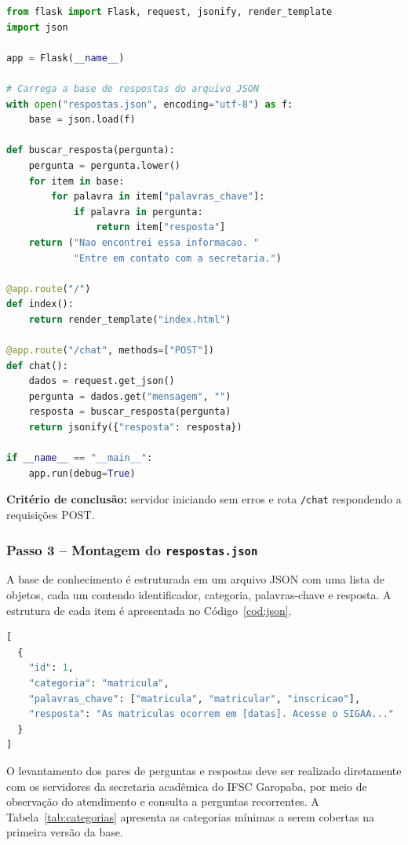 \begin{lstlisting}[language=Python, caption={Estrutura básica do app.py -- Protótipo 1}, label={cod:apppy}]
from flask import Flask, request, jsonify, render_template
import json

app = Flask(__name__)

# Carrega a base de respostas do arquivo JSON
with open("respostas.json", encoding="utf-8") as f:
    base = json.load(f)

def buscar_resposta(pergunta):
    pergunta = pergunta.lower()
    for item in base:
        for palavra in item["palavras_chave"]:
            if palavra in pergunta:
                return item["resposta"]
    return ("Nao encontrei essa informacao. "
            "Entre em contato com a secretaria.")

@app.route("/")
def index():
    return render_template("index.html")

@app.route("/chat", methods=["POST"])
def chat():
    dados = request.get_json()
    pergunta = dados.get("mensagem", "")
    resposta = buscar_resposta(pergunta)
    return jsonify({"resposta": resposta})

if __name__ == "__main__":
    app.run(debug=True)
\end{lstlisting}

\textbf{Critério de conclusão:} servidor iniciando sem erros e rota \texttt{/chat} respondendo a requisições POST.

\subsubsection{Passo 3 -- Montagem do \texttt{respostas.json}}

A base de conhecimento é estruturada em um arquivo JSON com uma lista de objetos, cada um contendo identificador, categoria, palavras-chave e resposta. A estrutura de cada item é apresentada no Código~\ref{cod:json}.

\begin{lstlisting}[language=Python, caption={Estrutura de um item do respostas.json}, label={cod:json}]
[
  {
    "id": 1,
    "categoria": "matricula",
    "palavras_chave": ["matricula", "matricular", "inscricao"],
    "resposta": "As matriculas ocorrem em [datas]. Acesse o SIGAA..."
  }
]
\end{lstlisting}

O levantamento dos pares de perguntas e respostas deve ser realizado diretamente com os servidores da secretaria acadêmica do IFSC Garopaba, por meio de observação do atendimento e consulta a perguntas recorrentes. A Tabela~\ref{tab:categorias} apresenta as categorias mínimas a serem cobertas na primeira versão da base.

